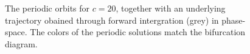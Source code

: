 \begin{figure}
\centering{}
\caption{The periodic orbits for $c=20$, together with an underlying trajectory obained through forward intergration (grey) in phase-space. The colors of the periodic solutions match the bifurcation diagram.}
\label{fig:roesslercut}
\end{figure}

\restoregeometry
